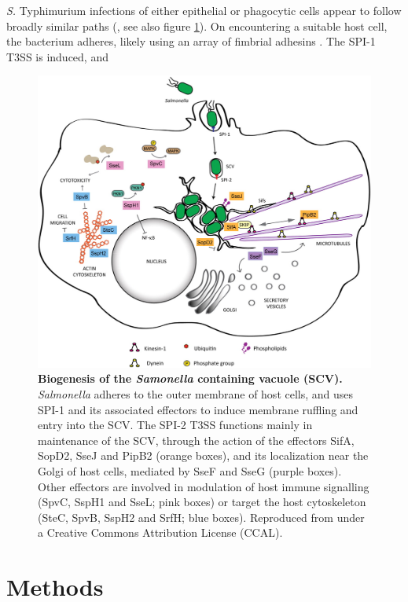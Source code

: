 \textit{S.} Typhimurium infections of either epithelial or phagocytic cells appear to follow broadly similar paths (\textcite{Figueira2012}, see also figure \ref{fig:SCV}). On encountering a suitable host cell, the bacterium adheres, likely using an array of fimbrial adhesins \parencite{Baumler1996a, Velden1998}. The SPI-1 T3SS is induced, and  

\begin{figure}[htp]
\begin{center}
\includegraphics[width=14cm]{SCV.jpg}
\caption[Biogenesis of the \textit{Samonella} containing vacuole]{\textbf{Biogenesis of the \textit{Samonella} containing vacuole (SCV).} \textit{Salmonella} adheres to the outer membrane of host cells, and uses SPI-1 and its associated effectors to induce membrane ruffling and entry into the SCV. The SPI-2 T3SS functions mainly in maintenance of the SCV, through the action of the effectors SifA, SopD2, SseJ and PipB2 (orange boxes), and its localization near the Golgi of host cells, mediated by SseF and SseG (purple boxes). Other effectors are involved in modulation of host immune signalling (SpvC, SspH1 and SseL; pink boxes) or target the host cytoskeleton (SteC, SpvB, SspH2 and SrfH; blue boxes). Reproduced from \textcite{Figueira2012} under a Creative Commons Attribution License (CCAL). 
} 
\label{fig:SCV}
\end{center}
\end{figure}

\section{Methods}

